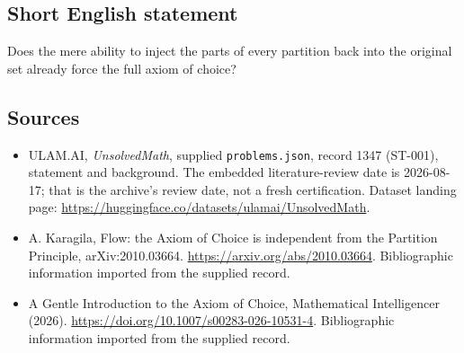\documentclass[11pt,a4paper]{article}
\begin{document}
\subsection{Short English statement}

Does the mere ability to inject the parts of every partition back into the original set already force the full axiom of choice?

\subsection{Sources}

{\small

\begin{itemize}

\item[\hypertarget{source:1347:1}{S1}] ULAM.AI, \emph{UnsolvedMath}, supplied \texttt{problems.json}, record 1347 (ST-001), statement and background. The embedded literature-review date is 2026-08-17; that is the archive’s review date, not a fresh certification. Dataset landing page: \url{https://huggingface.co/datasets/ulamai/UnsolvedMath}.

\item[\hypertarget{source:1347:2}{S2}] A. Karagila, Flow: the Axiom of Choice is independent from the Partition Principle, arXiv:2010.03664. \url{https://arxiv.org/abs/2010.03664}. Bibliographic information imported from the supplied record.

\item[\hypertarget{source:1347:3}{S3}] A Gentle Introduction to the Axiom of Choice, Mathematical Intelligencer (2026). \url{https://doi.org/10.1007/s00283-026-10531-4}. Bibliographic information imported from the supplied record.

\end{itemize}

}

\label{end:1347}
\end{document}
